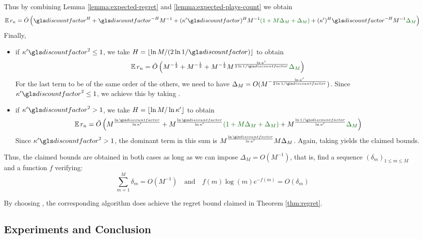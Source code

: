 Thus by combining Lemma \ref{lemma:expected-regret} and \ref{lemma:expected-plays-count} we obtain
\begin{equation*}
\expectedvalue r_n = \tilde{O}\left(\discount^H + \discount^{-H}M^{-1} + (\kappa' \discount)^{H}M^{-1}\diff{(1+M\Delta_M+\Delta_M)} + (\kappa')^H\discount^{-H}M^{-1}\diff{\Delta_M}\right)
\end{equation*}
Finally,
\begin{itemize}
	\item if $\kappa'\discount^2 \leq 1$, we take $H = \floor{\log M / (2\log 1/\discount)}$ to obtain
	\begin{equation*}
	\expectedvalue r_n = \tilde{O}\left(M^{-\frac{1}{2}} + M^{-\frac{1}{2}} + M^{-\frac{1}{2}}M^{\frac{\log \kappa'}{2\log 1/\discount}} \diff{\Delta_M}\right)
	\end{equation*}
	For the last term to be of the same order of the others, we need to have $\Delta_M = O(M^{-\frac{\log \kappa'}{2\log 1/\discount}})$. Since $\kappa'\discount^2 \leq 1$, we achieve this by taking .
	\item if $\kappa'\discount^2 > 1$, we take $H = \lfloor\ln M / \ln \kappa'\rfloor$ to obtain
	\begin{equation*}
	\expectedvalue r_n = \tilde{O}\left(M^{\frac{\log \discount}{\log \kappa'}} + M^{\frac{\log \discount}{\log \kappa'}}\diff{(1+M\Delta_M+\Delta_M)} + M^{\frac{\log 1/\discount}{\log \kappa'}}\diff{\Delta_M}\right)
	\end{equation*}
	Since $\kappa'\discount^2 > 1$, the dominant term in this sum is $M^{\frac{\log \discount}{\log \kappa'}}M\Delta_M$. Again, taking  yields the claimed bounds.
\end{itemize}
Thus, the claimed bounds are obtained in both cases as long as we can impose $\Delta_M = O(M^{-1})$, that is, find a sequence $(\delta_m)_{1\leq m\leq M}$ and a function $f$ verifying:
\begin{equation}
\sum_{m=1}^M \delta_m = O(M^{-1})\quad \text{and}\quad f(m)\log (m) e^{-f(m)} = O(\delta_m)
\end{equation}

By choosing , the corresponding \KLOLOP algorithm does achieve the regret bound claimed in Theorem \ref{thm:regret}.


\subsection{Experiments and Conclusion}
\label{sec:planning-experiments}

